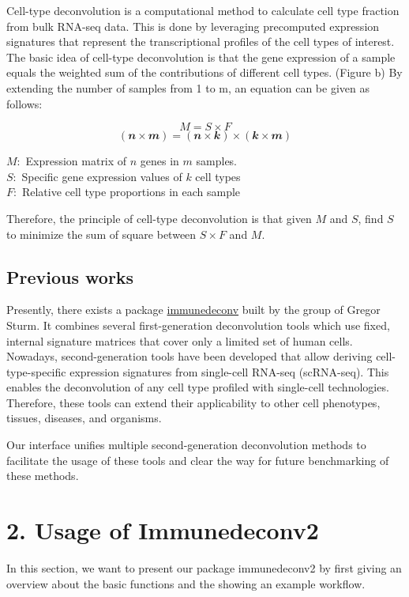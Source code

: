 \documentclass[
]{article}
\begin{document}
Cell-type deconvolution is a computational method to calculate cell type
fraction from bulk RNA-seq data. This is done by leveraging precomputed
expression signatures that represent the transcriptional profiles of the
cell types of interest. The basic idea of cell-type deconvolution is
that the gene expression of a sample equals the weighted sum of the
contributions of different cell types. (Figure b) By extending the
number of samples from 1 to m, an equation can be given as follows:

\[ M = S \times F \] \[(𝒏×𝒎)=(𝒏×𝒌)×(𝒌×𝒎)\]

\(𝑀:\) Expression matrix of \(n\) genes in \(m\) samples.\\
\(𝑆:\) Specific gene expression values of \(𝑘\) cell types\\
\(𝐹:\) Relative cell type proportions in each sample

Therefore, the principle of cell-type deconvolution is that given \(𝑀\)
and \(𝑆\), find \(S\) to minimize the sum of square between \(S×F\) and
\(𝑀\).

\hypertarget{previous-works}{%
\subsection{Previous works}\label{previous-works}}

Presently, there exists a package
\href{https://icbi-lab.github.io/immunedeconv/}{immunedeconv} built by
the group of Gregor Sturm. It combines several first-generation
deconvolution tools which use fixed, internal signature matrices that
cover only a limited set of human cells. Nowadays, second-generation
tools have been developed that allow deriving cell-type-specific
expression signatures from single-cell RNA-seq (scRNA-seq). This enables
the deconvolution of any cell type profiled with single-cell
technologies. Therefore, these tools can extend their applicability to
other cell phenotypes, tissues, diseases, and organisms.

Our interface unifies multiple second-generation deconvolution methods
to facilitate the usage of these tools and clear the way for future
benchmarking of these methods.

\hypertarget{usage-of-immunedeconv2}{%
\section{2. Usage of Immunedeconv2}\label{usage-of-immunedeconv2}}

In this section, we want to present our package immunedeconv2 by first
giving an overview about the basic functions and the showing an example
workflow.
\end{document}
